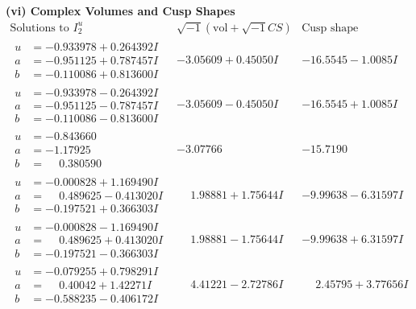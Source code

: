 \documentclass[1p]{elsarticle_modified}
\theoremstyle{definition}
\newcommand{\I}{\sqrt{-1}}
\begin{document}
\newpage\flushleft \textbf{(vi) Complex Volumes and Cusp Shapes}
$$\begin{array}{c|c|c}  
\text{Solutions to }I^u_{2}& \I (\text{vol} + \sqrt{-1}CS) & \text{Cusp shape}\\
 \hline 
\begin{aligned}
u &= -0.933978 + 0.264392 I \\
a &= -0.951125 + 0.787457 I \\
b &= -0.110086 + 0.813600 I\end{aligned}
 & -3.05609 + 0.45050 I & -16.5545 - 1.0085 I \\ \hline\begin{aligned}
u &= -0.933978 - 0.264392 I \\
a &= -0.951125 - 0.787457 I \\
b &= -0.110086 - 0.813600 I\end{aligned}
 & -3.05609 - 0.45050 I & -16.5545 + 1.0085 I \\ \hline\begin{aligned}
u &= -0.843660\phantom{ +0.000000I} \\
a &= -1.17925\phantom{ +0.000000I} \\
b &= \phantom{-}0.380590\phantom{ +0.000000I}\end{aligned}
 & -3.07766\phantom{ +0.000000I} & -15.7190\phantom{ +0.000000I} \\ \hline\begin{aligned}
u &= -0.000828 + 1.169490 I \\
a &= \phantom{-}0.489625 - 0.413020 I \\
b &= -0.197521 + 0.366303 I\end{aligned}
 & \phantom{-}1.98881 + 1.75644 I & -9.99638 - 6.31597 I \\ \hline\begin{aligned}
u &= -0.000828 - 1.169490 I \\
a &= \phantom{-}0.489625 + 0.413020 I \\
b &= -0.197521 - 0.366303 I\end{aligned}
 & \phantom{-}1.98881 - 1.75644 I & -9.99638 + 6.31597 I \\ \hline\begin{aligned}
u &= -0.079255 + 0.798291 I \\
a &= \phantom{-}0.40042 + 1.42271 I \\
b &= -0.588235 - 0.406172 I\end{aligned}
 & \phantom{-}4.41221 - 2.72786 I & \phantom{-}2.45795 + 3.77656 I \\ \hline\begin{aligned}

\end{aligned}
\end{array}$$
\end{document}
